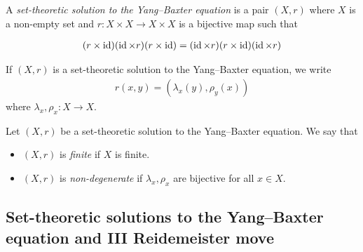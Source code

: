     \begin{definition}
        A \emph{set-theoretic solution to the Yang--Baxter equation} is a pair $(X,r)$ where $X$ is a non-empty set and $r: X\times X \to X \times X$ is a bijective map such that
        
        \begin{align*}
            (r\times \operatorname{id})(\operatorname{id} \times r)(r\times \operatorname{id}) = (\operatorname{id} \times r)(r\times \operatorname{id})(\operatorname{id} \times r)
        \end{align*}
    \end{definition}
    
    \begin{convention}
        If $(X,r)$ is a set-theoretic solution to the Yang--Baxter equation, we write 
        \begin{align*}
            r(x,y) = (\lambda_x(y),\rho_y(x))        
        \end{align*}
        where $\lambda_x,\rho_x:X\to X$.
    \end{convention}


    \begin{definition}
        Let $(X,r)$ be a set-theoretic solution to the  Yang--Baxter equation. We say that 
        \begin{itemize}
            \item $(X,r)$ is \emph{finite} if $X$ is finite.
            \item $(X,r)$ is \emph{non-degenerate} if $\lambda_x,\rho_x$ are bijective for all $x\in X$.
        \end{itemize}
    \end{definition}

\subsection{Set-theoretic solutions to the Yang--Baxter equation and III Reidemeister move}

